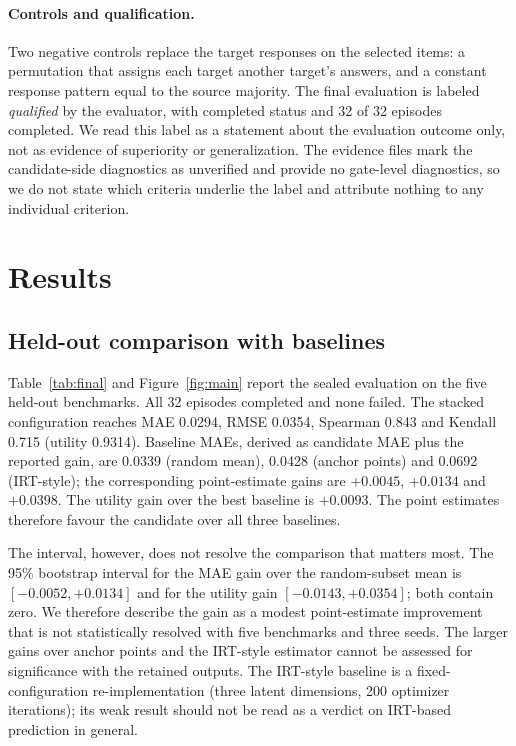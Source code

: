 \documentclass{article}
\begin{document}
\paragraph{Controls and qualification.} Two negative controls replace the target responses on the selected items: a permutation that assigns each target another target's answers, and a constant response pattern equal to the source majority. The final evaluation is labeled \emph{qualified} by the evaluator, with completed status and 32 of 32 episodes completed. We read this label as a statement about the evaluation outcome only, not as evidence of superiority or generalization. The evidence files mark the candidate-side diagnostics as unverified and provide no gate-level diagnostics, so we do not state which criteria underlie the label and attribute nothing to any individual criterion.

\section{Results}
\label{sec:results}
\subsection{Held-out comparison with baselines}
Table~\ref{tab:final} and Figure~\ref{fig:main} report the sealed evaluation on the five held-out benchmarks. All 32 episodes completed and none failed. The stacked configuration reaches MAE 0.0294, RMSE 0.0354, Spearman 0.843 and Kendall 0.715 (utility 0.9314). %
Baseline MAEs, derived as candidate MAE plus the reported gain, are 0.0339 (random mean), 0.0428 (anchor points) and 0.0692 (IRT-style); the corresponding point-estimate gains are $+0.0045$, $+0.0134$ and $+0.0398$. %
The utility gain over the best baseline is $+0.0093$. The point estimates therefore favour the candidate over all three baselines.

The interval, however, does not resolve the comparison that matters most. The 95\% bootstrap interval for the MAE gain over the random-subset mean is $[-0.0052,+0.0134]$ and for the utility gain $[-0.0143,+0.0354]$; both contain zero. %
We therefore describe the gain as a modest point-estimate improvement that is not statistically resolved with five benchmarks and three seeds. The larger gains over anchor points and the IRT-style estimator cannot be assessed for significance with the retained outputs. The IRT-style baseline is a fixed-configuration re-implementation (three latent dimensions, 200 optimizer iterations); its weak result should not be read as a verdict on IRT-based prediction in general.
\end{document}
